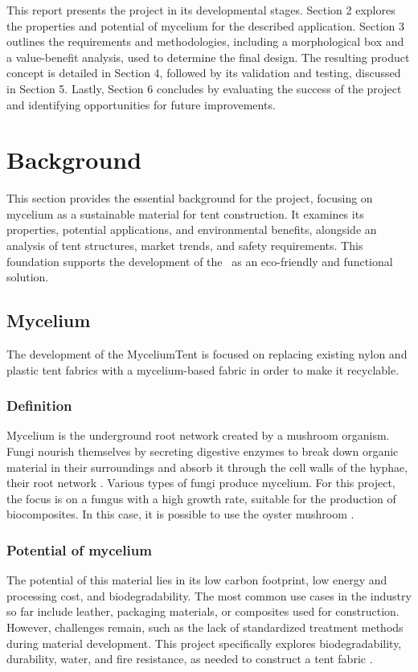 \documentclass{article}
\begin{document}
This report presents the project in its developmental stages. Section 2 explores the
properties and potential of mycelium for the described application. Section 3 outlines the
requirements and methodologies, including a morphological box and a value-benefit
analysis, used to determine the final design. The resulting product concept is detailed in
Section 4, followed by its validation and testing, discussed in Section 5. Lastly,
Section 6 concludes by evaluating the success of the project and identifying opportunities
for future improvements.


\newpage
\section{Background}
This section provides the essential background for the project, focusing on mycelium as a
sustainable material for tent construction. It examines its properties, potential
applications, and environmental benefits, alongside an analysis of tent structures, market
trends, and safety requirements. This foundation supports the development of the \myc\ as
an eco-friendly and functional solution.

\subsection{Mycelium}
The development of the MyceliumTent is focused on replacing existing nylon and plastic
tent fabrics with a mycelium-based fabric in order to make it recyclable.

\subsubsection{Definition}
Mycelium is the underground root network created by a mushroom organism. Fungi
nourish themselves by secreting digestive enzymes to break down organic material in
their surroundings and absorb it through the cell walls of the hyphae, their root network
\parencite{fungus}. Various types of fungi produce mycelium. For this project, the focus
is on a fungus with a high growth rate, suitable for the production of biocomposites. In
this case, it is possible to use the oyster mushroom \parencite{mushroom}.

\subsubsection{Potential of mycelium}
The potential of this material lies in its low carbon footprint, low energy and processing
cost, and biodegradability. The most common use
cases in the industry so far include leather, packaging materials, or composites used for
construction. However, challenges remain, such as the lack of standardized treatment
methods during material development. This project specifically explores
biodegradability, durability, water, and fire resistance, as needed to construct a tent
fabric \parencite{ALANEME2023234}.
\end{document}
